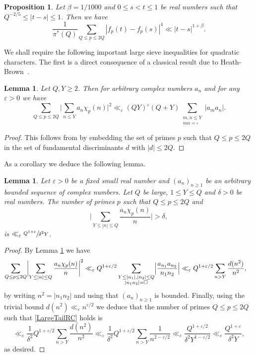 \documentclass[10pt]{amsart}
\theoremstyle{plain}
\newtheorem{lem}[thm]{Lemma}
\newtheorem{pro}[thm]{Proposition}
\theoremstyle{definition}
\let\ep\varepsilon
\begin{document}
\begin{pro}\label{ThirdRangeTSProposition}
Let $\beta=1/1000$ and $0\leq s<t\leq 1$ be real numbers such that $Q^{-2/5}\leq |t-s|\leq 1$. Then we have
\[
\frac{1}{\pi^*(Q)}\sum_{Q\leq p\leq 2Q} |f_p(t)-f_p(s)|^{4} \ll |t-s|^{1+\beta}.
\]
\end{pro}
We shall require the following important large sieve inequalities for quadratic characters. The first is a direct consequence of a classical result due to Heath-Brown~\cite{HB}.
\begin{lem}\label{HBLargeSieve}
Let $Q, Y\geq 2$. Then for arbitrary complex numbers $a_n$
and for any $\ep>0$ we have
\[
\sum_{Q\leq p\leq 2 Q} \biggl|\sum_{n\leq Y} a_n \chi_p(n)\biggr|^2 \ll_{\ep} (QY)^{\ep}(Q+Y) \sum_{\substack{m, n \leq Y\\ mn= \square}} |a_ma_n|.
\]
\end{lem}
\begin{proof}
This follows from \cite[Cor.\,2]{HB} by embedding the set of primes $p$ such that $Q\leq p\leq 2Q$ in the set of fundamental discriminants $d$ with $|d|\leq 2Q$.
\end{proof}

As a corollary we deduce the following lemma.

\begin{lem}\label{BoundTailPolyaRC} Let $\ep>0$ be a fixed small real number and $(a_n)_{n\geq 1}$ be an arbitrary bounded sequence of complex numbers. Let $Q$ be large, $1\leq Y\leq Q$ and $\delta>0$ be real numbers. The number of primes $p$ such that $Q\leq p\leq 2Q$ and\vspace*{-3pt}
\begin{equation}\label{LargeTailRC}
\biggl|\sum_{Y\leq |n|\leq Q} \frac{a_n\chi_p(n)}{n}\biggr| >\delta,
\end{equation}
is
$\ll_{\ep} \sfrac{Q^{1+\ep}}{\delta^2 Y}$.
\end{lem}

\begin{proof}
By Lemma \ref{HBLargeSieve} we have
\begin{align*}
\sum_{Q\leq p\leq 2Q}\biggl|\sum_{Y\leq |n|\leq Q} \frac{a_n\chi_p(n) }{n}\biggr|^2 &\ll_{\ep} Q^{1+\ep/2} \sum_{\substack{Y\leq |n_1|, |n_2|\leq Q\\ |n_1n_2|=\square}} \Bigl|\frac{a_{n_1}a_{n_2}}{n_1n_2}\Bigr|
\ll_{\ep} Q^{1+\ep/2} \sum_{n>Y} \frac{d(n^2)}{n^2},
\end{align*}
by writing $n^2=|n_1n_2|$ and using that $(a_n)_{n\geq 1}$ is bounded. Finally, using the trivial bound $d(n^2)\ll_{\ep} n^{\ep/2}$ we deduce that the number of primes $Q\leq p\leq 2Q$ such that \eqref{LargeTailRC} holds is
\[
\ll_{\ep} \frac{1}{\delta^2} Q^{1+\ep/2} \sum_{n>Y} \frac{d(n^2)}{n^2}
\ll_{\ep} \frac{1}{\delta^2} Q^{1+\ep/2} \sum_{n>Y} \frac{1}{n^{2-\ep/2}} \ll_{\ep} \frac{Q^{1+\ep/2}}{\delta^2 Y^{1-\ep/2}}\ll_{\ep} \frac{Q^{1+\ep}}{\delta^2 Y},
\]
as desired.
\end{proof}
\end{document}

